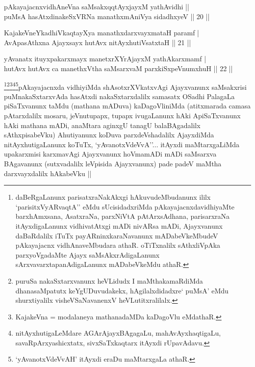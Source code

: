 \begin{shl}
pAkayajacnxvidhAneVna saMsakxqqtAyx\s \s jayxM yathAvidhi || \\
puMsA hasAtxdinakeSxVRNa manathxmAniVya sidadhxyeV \hfill|| 20 || 
\end{shl}

\begin{shl}
KajakeVneYkadhiVkaqtayXya manathxdarxvayxmataH paramf | \\
AvApasAthxna Ajayxsayx hutAvx nitAyxhutiVsatxtaH \hfill|| 21 || 
\end{shl}

\begin{shl}
yAvanatx ituyxpakarxmayx manetxrXYrAjayxM yathAkarxmamf | \\
hutAvx hutAvx ca manethxV\s tha saMsarxvaM parxkiSxpeVnumxhuH \hfill|| 22 || 
\end{shl}

\begin{artha}
\footnote{daBeRgaLanunx parisatxraNakAkxgi hAkuvudeMbudanunx ililx `parisitxVyARvaqtA'' eMdu sUcisidadxriMda pAkayajacnxdavidhiyaMte barxhAmxsana, AsatxraNa, parxNiVtA pAtArxsAdhana, parisarxraNa itAyxdigaLanunx vidhivatAtxgi mADi nivARsa mADi, Ajayxvanunx daBaRdalilx iTuTx payARninxkaraNavanunx mADabeVkeMbudeV pAkayajacnx vidhAnaveMbudara athaR. oTiTxnalilx sAthxliVpAka parxyoVgadaMte Ajayx saMsAkxrAdigaLanunx sArxvavarxtapanAdigaLanunx mADabeVkeMdu athaR.}\footnote{puruSa nakaSxtarxvanunx heVLidudx I maMthakamaRdiMda dhanasaMpatutx keYgUDuvudakekx, hAgilalxdidadxre` puMsA' eMdu shurxtiyalilx visheVSaNavanenxV heVLutitxralilalx.}\footnote{KajakeVna = modalaneya mathanadaMDa kaDagoVlu eMdathaR.}\footnote{nitAyxhutigaLeMdare AGArAjayxBAgagaLu, mahAvAyxhaqtigaLu, savaRpArxyashicxtatx, sivxSaTxkaqtarx itAyxdi rUpavAdavu.}\footnote{`yAvanotxVdeVvAH' itAyxdi eraDu maMtarxgaLa athaR.}pAkayajacnxda vidhiyiMda shAsotxrXVkatxvAgi Ajayxvanunx saMsakxrisi puMnakaSxtarxvAda hasAtxdi nakaSxtarxdalilx samasatx OSadhi PalagaLa piSaTxvanunx taMdu (mathana mADuva) kaDagoVliniMda (atitxmarada camasa pAtarxdalilx mosaru, jeVnutupapx, tupapx ivugaLanunx hAki ApiSaTxvanunx hAki mathana mADi, anaMtara aginxgU tanagU balaBAgadalilx sAthxpisabeVku) Ahutiyanunx koDuva parxdeVshadalilx AjayxdiMda nitAyxhutigaLanunx koTuTx, `yAvanotxVdeVvA''... itAyxdi maMtarxgaLiMda upakarxmisi karxmavAgi Ajayxvanunx hoVmamADi mADi saMsarxva BAgavanunx (sutxvadalilx leVpisida Ajayxvanunx) pade padeV maMtha darxvayxdalilx hAkabeVku ||
\end{artha}

